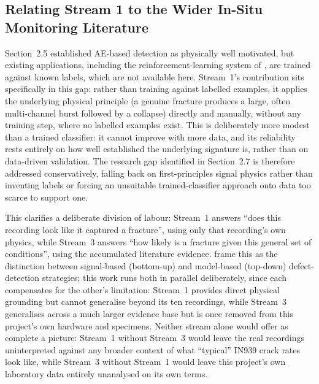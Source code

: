 \documentclass[a4paper]{article}
\begin{document}
\subsection{Relating Stream 1 to the Wider In-Situ Monitoring Literature}
Section~2.5 established AE-based detection as physically well motivated, but existing applications, including the reinforcement-learning system of \citet{wasmer2019}, are trained against known labels, which are not available here. Stream~1's contribution sits specifically in this gap: rather than training against labelled examples, it applies the underlying physical principle (a genuine fracture produces a large, often multi-channel burst followed by a collapse) directly and manually, without any training step, where no labelled examples exist. This is deliberately more modest than a trained classifier: it cannot improve with more data, and its reliability rests entirely on how well established the underlying signature is, rather than on data-driven validation. The research gap identified in Section~2.7 is therefore addressed conservatively, falling back on first-principles signal physics rather than inventing labels or forcing an unsuitable trained-classifier approach onto data too scarce to support one.

This clarifies a deliberate division of labour: Stream~1 answers ``does this recording look like it captured a fracture'', using only that recording's own physics, while Stream~3 answers ``how likely is a fracture given this general set of conditions'', using the accumulated literature evidence. \citet{grasso2017} frame this as the distinction between signal-based (bottom-up) and model-based (top-down) defect-detection strategies; this work runs both in parallel deliberately, since each compensates for the other's limitation: Stream~1 provides direct physical grounding but cannot generalise beyond its ten recordings, while Stream~3 generalises across a much larger evidence base but is once removed from this project's own hardware and specimens. Neither stream alone would offer as complete a picture: Stream~1 without Stream~3 would leave the real recordings uninterpreted against any broader context of what ``typical'' IN939 crack rates look like, while Stream~3 without Stream~1 would leave this project's own laboratory data entirely unanalysed on its own terms.
\end{document}
